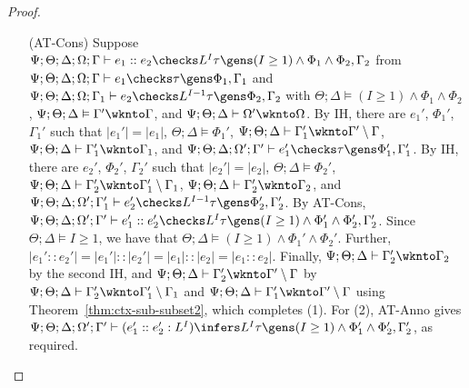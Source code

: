 \begin{proof}
\begin{itemize}
  \item[(AT-Cons)] Suppose $\Psi ; \Theta ; \Delta ; \Omega ; \Gamma\vdash e_1 :: e_2 \checks L^I \tau \gens (I \geq 1) \wedge \Phi_1 \wedge \Phi_2, \Gamma_2$
  from $\Psi ; \Theta ; \Delta ; \Omega ; \Gamma\vdash e_1 \checks \tau \gens \Phi_1, \Gamma_1$ and 
       $\Psi ; \Theta ; \Delta ; \Omega ; \Gamma_1\vdash e_2 \checks L^{I-1} \tau \gens \Phi_2, \Gamma_2$ with 
       $\Theta ; \Delta \vDash (I \geq 1) \wedge \Phi_1 \wedge \Phi_2$, 
       $\Psi ; \Theta ; \Delta \vDash \Gamma' \wknto \Gamma$, and 
       $\Psi ; \Theta ; \Delta \vdash \Omega' \wknto \Omega$.
       By IH, there are $e_1'$, $\Phi_1'$, $\Gamma_1'$ such that $|e_1'| = |e_1|$, 
       $\Theta ; \Delta \vDash \Phi_1'$, 
       $\Psi ; \Theta ; \Delta \vdash \Gamma_1' \wknto \Gamma' \setminus \Gamma$, 
       $\Psi ; \Theta ; \Delta \vdash \Gamma_1' \wknto \Gamma_1$, and
       $\Psi ; \Theta ; \Delta ; \Omega' ; \Gamma' \vdash e_1' \checks \tau \gens \Phi_1',\Gamma_1'$.
       By IH, there are $e_2'$, $\Phi_2'$, $\Gamma_2'$ such that $|e_2'| = |e_2|$,
       $\Theta ; \Delta \vDash \Phi_2'$,
       $\Psi ; \Theta ; \Delta \vdash \Gamma_2' \wknto \Gamma_1' \setminus \Gamma_1$,
       $\Psi ; \Theta ; \Delta \vdash \Gamma_2' \wknto \Gamma_2$, and
       $\Psi ; \Theta ; \Delta ; \Omega' ; \Gamma_1' \vdash e_2' \checks L^{I-1} \tau \gens \Phi_2',\Gamma_2'$.
       By AT-Cons,
       $\Psi ; \Theta ; \Delta ; \Omega' ; \Gamma' \vdash e_1' :: e_2' \checks L^I \tau \gens (I \geq 1) \wedge \Phi_1' \wedge \Phi_2',\Gamma_2'$.
       Since $\Theta ; \Delta \vDash I \geq 1$, we have that $\Theta ; \Delta \vDash (I \geq 1) \wedge \Phi_1' \wedge \Phi_2'$. Further, $|e_1' :: e_2'| = |e_1'| :: |e_2'| = |e_1| :: |e_2| = |e_1 :: e_2|$. Finally, $\Psi ; \Theta ; \Delta \vdash \Gamma_2' \wknto \Gamma_2$ by the second IH, and $\Psi ; \Theta ; \Delta \vdash \Gamma_2' \wknto \Gamma' \setminus \Gamma$ by $\Psi ; \Theta ; \Delta \vdash \Gamma_2' \wknto \Gamma_1' \setminus \Gamma_1$ and $\Psi ; \Theta ; \Delta \vdash \Gamma_1' \wknto \Gamma' \setminus \Gamma$ using Theorem~\ref{thm:ctx-sub-subset2}, which completes (1). For (2), AT-Anno gives
       $\Psi ; \Theta ; \Delta ; \Omega' ; \Gamma' \vdash (e_1' :: e_2' : L^I) \infers L^I \tau \gens (I \geq 1) \wedge \Phi_1' \wedge \Phi_2',\Gamma_2'$, as required.
  

\end{itemize}
\end{proof}

